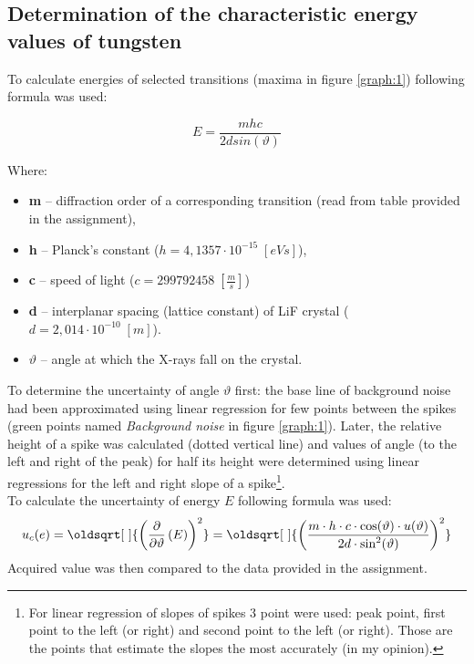\documentclass[12pt, a4paper]{extarticle}
\renewcommand*{\sqrt}[2][\ ]{\oldsqrt[#1]{#2} }
\begin{document}
	\subsection{Determination of the characteristic energy values of tungsten}




	To calculate energies of selected transitions (maxima in figure \ref{graph:1}) following formula was used:

	\begin{equation}\label{key}
		E = \dfrac{mhc}{2 d sin(\vartheta)}
	\end{equation}

	Where:
	\begin{itemize}
		\setlength\itemsep{-0.2em}
		\item \textbf{m} -- diffraction order of a corresponding transition (read from table provided in the assignment),
		\item \textbf{h} -- Planck's constant ($ h = 4,1357 \cdot 10^{-15} \; [eVs] $),
		\item \textbf{c} -- speed of light ($ c = 299792458 \; [\frac{m}{s}] $)
		\item \textbf{d} -- interplanar spacing (lattice constant) of LiF crystal ($ d = 2,014 \cdot 10^{-10} \; [m] $).
		\item \textbf{$ \vartheta $} -- angle at which the X-rays fall on the crystal.
	\end{itemize}

	\pagebreak
	To determine the uncertainty of angle $ \vartheta $ first: the base line of background noise had been approximated using linear regression for few points between the spikes (green points named \textit{Background noise} in figure \ref{graph:1}). Later, the relative height of a spike was calculated (dotted vertical line) and values of angle (to the left and right of the peak) for half its height were determined using linear regressions for the left and right slope of a spike\footnote{For linear regression of slopes of spikes 3 point were used: peak point, first point to the left (or right) and second point to the left (or right). Those are the points that estimate the slopes the most accurately \tiny (in my opinion).}.\\

	To calculate the uncertainty of energy $ E $ following formula was used:
	\begin{equation}\label{key}
		u_c(e) = \sqrt{\left( \dfrac{\partial}{\partial \vartheta} \left( E \right) \right)^2}= \sqrt{\left( \dfrac{m \cdot h \cdot c \cdot \cos(\vartheta) \cdot u(\vartheta)}{2d \cdot \sin^2(\vartheta)}\right)^2}
	\end{equation}
	Acquired value was then compared to the data provided in the assignment.\\
\end{document}
